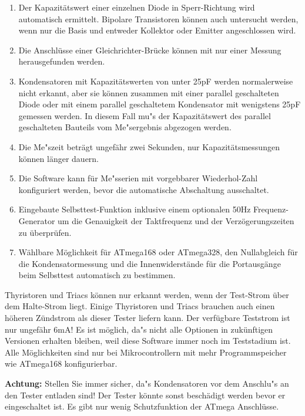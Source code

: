 \begin{enumerate}
\item Der Kapazit\"atswert einer einzelnen Diode in Sperr-Richtung wird automatisch ermittelt.
Bipolare Transistoren k\"onnen auch untersucht werden, wenn nur die Basis und entweder Kollektor oder Emitter angeschlossen wird.
\item Die Anschl\"usse einer Gleichrichter-Br\"ucke k\"onnen mit nur einer Messung herausgefunden werden.
\item Kondensatoren mit Kapazit\"atswerten von unter 25pF werden normalerweise nicht erkannt, 
aber sie k\"onnen zusammen mit einer parallel geschalteten Diode oder mit einem parallel geschaltetem Kondensator mit
wenigstens 25pF gemessen werden.
In diesem Fall mu"s der Kapazit\"atswert des parallel geschalteten Bauteils vom Me"sergebnis abgezogen werden.
\item Die Me"szeit betr\"agt ungef\"ahr zwei Sekunden, nur Kapazit\"atsmessungen k\"onnen l\"anger dauern.
\item Die Software kann f\"ur Me"sserien mit vorgebbarer Wiederhol-Zahl konfiguriert werden, bevor die automatische Abschaltung ausschaltet.
\item Eingebaute Selbsttest-Funktion inklusive einem optionalen 50Hz Frequenz-Generator um die Genauigkeit der Taktfrequenz
und der Verz\"ogerungszeiten zu \"uberpr\"ufen.
\item W\"ahlbare M\"oglichkeit f\"ur ATmega168 oder ATmega328, den Nullabgleich f\"ur die Kondensatormessung und die Innenwiderst\"ande f\"ur die
Portausg\"ange beim Selbsttest automatisch zu bestimmen.
\end{enumerate}

Thyristoren und Triacs k\"onnen nur erkannt werden, wenn der Test-Strom \"uber dem Halte-Strom liegt.
Einige Thyristoren und Triacs brauchen auch einen h\"oheren Z\"undstrom als dieser Tester liefern kann.
Der verf\"ugbare Teststrom ist nur ungef\"ahr 6mA!
Es ist m\"oglich, da"s nicht alle Optionen in zuk\"unftigen Versionen erhalten bleiben, weil diese Software
immer noch im Teststadium ist.
Alle M\"oglichkeiten sind nur bei Mikrocontrollern mit mehr Programmspeicher wie ATmega168 konfigurierbar.

\vspace{1cm}
\textbf{{\Large Achtung:}} Stellen Sie immer sicher, da"s Kondensatoren vor dem Anschlu"s an den Tester entladen sind!
Der Tester k\"onnte sonst besch\"adigt werden bevor er eingeschaltet ist.
Es gibt nur wenig Schutzfunktion der ATmega Anschl\"usse.


